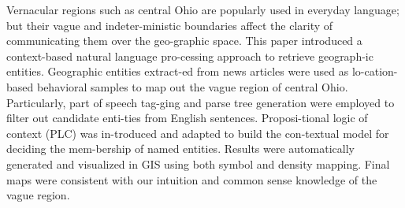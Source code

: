 Vernacular regions such as central Ohio are popularly used in everyday language; but their vague and indeter-ministic boundaries affect the clarity of communicating them over the geo-graphic space. This paper introduced a context-based natural language pro-cessing approach to retrieve geograph-ic entities. Geographic entities extract-ed from news articles were used as lo-cation-based behavioral samples to map out the vague region of central Ohio. Particularly, part of speech tag-ging and parse tree generation were employed to filter out candidate enti-ties from English sentences. Proposi-tional logic of context (PLC) was in-troduced and adapted to build the con-textual model for deciding the mem-bership of named entities. Results were automatically generated and visualized in GIS using both symbol and density mapping. Final maps were consistent with our intuition and common sense knowledge of the vague region.
